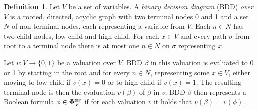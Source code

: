 \documentclass[
  digital, %
  twoside, %
  table,   %
  nolof,     %
  nolot,     %
]{fithesis3}
\theoremstyle{definition}
\newtheorem{definition}{Definition}
\theoremstyle{remark}
\newcommand{\BF}[1]{\mathbf{\Phi}_{#1}^{\normalfont{\text{\tiny BF}}}}
\begin{document}
\begin{definition}
  Let $V$ be a set of variables. A \emph{binary decision diagram} (BDD) \emph{over $V$} is a rooted, directed, acyclic graph with two terminal nodes 0 and 1 and a set $N$ of non-terminal nodes, each representing a variable from $V$. Each $n \in N$ has two child nodes, low child and high child. For each $x \in V$ and every path $\sigma$ from root to a terminal node there is at most one $n \in N$ on $\sigma$ representing $x$.
\end{definition}


Let $v\colon V \to \{0,1\}$ be a valuation over $V$. BDD $\beta$ in this valuation is evaluated to 0 or 1 by starting in the root and for every $n \in N$, representing some $x \in V$, either moving to low child if $v(x) = 0$ or to high child if $v(x) = 1$. The resulting terminal node is then the evaluation $v(\beta)$ of $\beta$ in $v$. BDD $\beta$ then represents a Boolean formula $\phi \in \BF{V}$ if for each valuation $v$ it holds that $v(\beta) = v(\phi)$.
\end{document}
